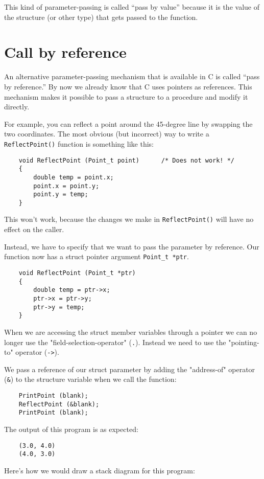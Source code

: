 This kind of parameter-passing is called ``pass by value''
because it is the value of the structure (or other type) that
gets passed to the function.

\section{Call by reference}
\label{Call by reference}

An alternative parameter-passing mechanism that is available
in C is called ``pass by reference.''  
By now we already know that C uses pointers as references.
This mechanism makes
it possible to pass a structure to a procedure and modify it directly.

For example, you can reflect a point around the 45-degree line by
swapping the two coordinates.  The most obvious (but incorrect) way to
write a {\tt ReflectPoint()} function is something like this:

\begin{verbatim}
	void ReflectPoint (Point_t point)      /* Does not work! */
	{
		double temp = point.x;
		point.x = point.y;
		point.y = temp;
	}
\end{verbatim}
%
This won't work, because the changes we make in {\tt ReflectPoint()}
will have no effect on the caller.

Instead, we have to specify that we want to pass the parameter by
reference.  
Our function now has a struct pointer argument {\tt Point\_t~*ptr}.


\begin{verbatim}
	void ReflectPoint (Point_t *ptr)
	{
		double temp = ptr->x;
		ptr->x = ptr->y;
		ptr->y = temp;
	}
\end{verbatim}
When we are accessing the struct member variables through a pointer 
we can no longer use the "field-selection-operator" ({\tt .}). Instead we need to use
the "pointing-to" operator ({\tt ->}).

%
We pass a reference of our struct parameter by adding the "address-of"  operator ({\tt \&}) to the
structure variable when we call the function:

\begin{verbatim}
	PrintPoint (blank);
	ReflectPoint (&blank);
	PrintPoint (blank);
\end{verbatim}
%
The output of this program is as expected:

\begin{verbatim}
	(3.0, 4.0)
	(4.0, 3.0)
\end{verbatim}
%
Here's how we would draw a stack diagram for this program:


